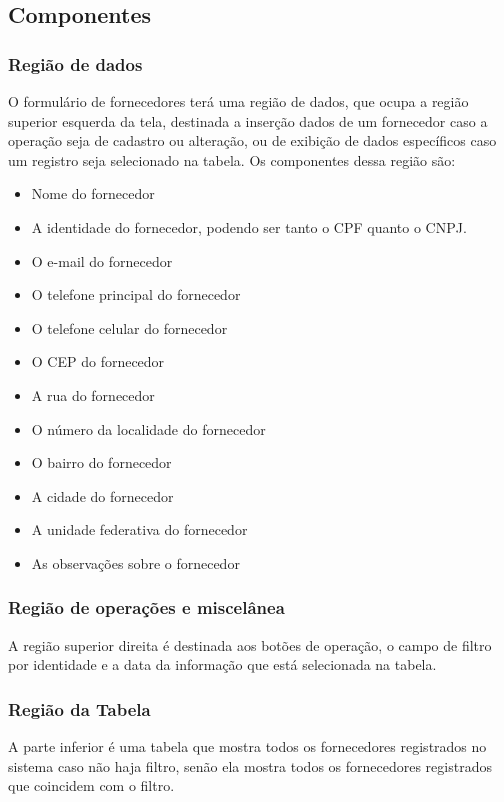 \documentclass[
	article,			%
	12pt,				%
	oneside,			%
	a4paper,			%
	english,			%
	brazil,				%
	sumario=tradicional
	]{abntex2}
\begin{document}
	\subsection{Componentes}
		\subsubsection{Região de dados}
		O formulário de fornecedores terá uma região de dados, que ocupa a região superior esquerda da tela, destinada a inserção dados de um fornecedor caso a operação seja de cadastro ou alteração, ou de exibição de dados específicos caso um registro seja selecionado na tabela.
		Os componentes dessa região são:
		\begin{itemize}\itemsep1.5pt
			\item Nome do fornecedor
			\item A identidade do fornecedor, podendo ser tanto o CPF quanto o CNPJ.
			\item O e-mail do fornecedor
			\item O telefone principal do fornecedor
			\item O telefone celular do fornecedor
			\item O CEP do fornecedor
			\item A rua do fornecedor
			\item O número da localidade do fornecedor
			\item O bairro do fornecedor
			\item A cidade do fornecedor
			\item A unidade federativa do fornecedor
			\item As observações sobre o fornecedor
		\end{itemize}	
		\subsubsection{Região de operações e miscelânea}
		A região superior direita é destinada aos botões de operação, o campo de filtro por identidade e a data da informação que está selecionada na tabela.
		\subsubsection{Região da Tabela}
		A parte inferior é uma tabela que mostra todos os fornecedores registrados no sistema caso não haja filtro, senão ela mostra todos os fornecedores registrados que coincidem com o filtro.
	\newpage
\end{document}
